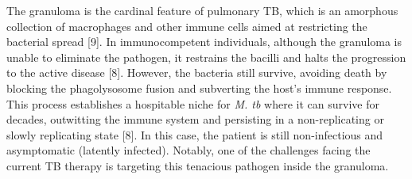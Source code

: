 \documentclass{article}
\begin{document}
The granuloma is the cardinal feature of pulmonary TB, which is an amorphous collection of macrophages and other immune cells aimed at restricting the bacterial spread [9]. In immunocompetent individuals, although the granuloma is unable to eliminate the pathogen, it restrains the bacilli and halts the progression to the active disease [8]. However, the bacteria still survive, avoiding death by blocking the phagolysosome fusion and subverting the host's immune response. This process establishes a hospitable niche for \textit{M. tb} where it can survive for decades, outwitting the immune system and persisting in a non-replicating or slowly replicating state [8]. In this case, the patient is still non-infectious and asymptomatic (latently infected). Notably, one of the challenges facing the current TB therapy is targeting this tenacious pathogen inside the granuloma.
\end{document}
